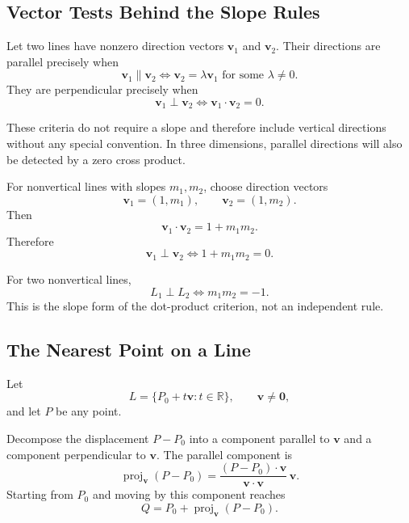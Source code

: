 \subsection{Vector Tests Behind the Slope Rules}

\begin{theorembox}
Let two lines have nonzero direction vectors $\mathbf v_1$ and $\mathbf v_2$.
Their directions are parallel precisely when
\[
\boxed{
\mathbf v_1\parallel\mathbf v_2
\iff
\mathbf v_2=\lambda\mathbf v_1
\text{ for some }\lambda\neq0
}.
\]
They are perpendicular precisely when
\[
\boxed{
\mathbf v_1\perp\mathbf v_2
\iff
\mathbf v_1\cdot\mathbf v_2=0
}.
\]
\end{theorembox}

\begin{interpretationbox}
These criteria do not require a slope and therefore include vertical directions
without any special convention. In three dimensions, parallel directions will
also be detected by a zero cross product.
\end{interpretationbox}

\begin{derivationbox}
For nonvertical lines with slopes $m_1,m_2$, choose direction vectors
\[
\mathbf v_1=(1,m_1),
\qquad
\mathbf v_2=(1,m_2).
\]
Then
\[
\mathbf v_1\cdot\mathbf v_2=1+m_1m_2.
\]
Therefore
\[
\mathbf v_1\perp\mathbf v_2
\iff
1+m_1m_2=0.
\]
\end{derivationbox}

\begin{theorembox}
For two nonvertical lines,
\[
\boxed{
L_1\perp L_2
\iff
m_1m_2=-1
}.
\]
This is the slope form of the dot-product criterion, not an independent rule.
\end{theorembox}

\subsection{The Nearest Point on a Line}

Let
\[
L=\{P_0+t\mathbf v:t\in\mathbb R\},
\qquad \mathbf v\neq\mathbf0,
\]
and let $P$ be any point.

\begin{derivationbox}
Decompose the displacement $P-P_0$ into a component parallel to $\mathbf v$ and
a component perpendicular to $\mathbf v$. The parallel component is
\[
\operatorname{proj}_{\mathbf v}(P-P_0)
=
\frac{(P-P_0)\cdot\mathbf v}{\mathbf v\cdot\mathbf v}\,\mathbf v.
\]
Starting from $P_0$ and moving by this component reaches
\[
Q=P_0+\operatorname{proj}_{\mathbf v}(P-P_0).
\]
\end{derivationbox}

